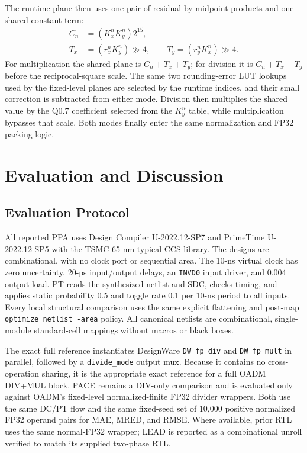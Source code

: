 \documentclass[conference]{IEEEtran}
\begin{document}
The runtime plane then uses one pair of residual-by-midpoint products and one
shared constant term:
\begin{align}
 C_n &= (K_x^nK_y^n)2^{15},\\
 T_x &= (r_x^nK_y^n) \gg 4,\qquad
 T_y = (r_y^nK_x^n) \gg 4.
\end{align}
For multiplication the shared plane is $C_n+T_x+T_y$; for division it is
$C_n+T_x-T_y$ before the reciprocal-square scale. The same two rounding-error
LUT lookups used by the fixed-level planes are selected by the runtime
indices, and their small correction is subtracted from either mode. Division
then multiplies the shared value by the Q0.7 coefficient selected from the
$K_y^n$ table, while multiplication bypasses that scale. Both modes finally
enter the same normalization and FP32 packing logic.

\section{Evaluation and Discussion}
\subsection{Evaluation Protocol}
All reported PPA uses Design Compiler U-2022.12-SP7 and PrimeTime
U-2022.12-SP5 with the TSMC 65-nm typical CCS library. The designs are
combinational, with no clock port or sequential area. The 10-ns virtual clock
has zero uncertainty, 20-ps input/output delays, an \texttt{INVD0} input
driver, and 0.004 output load. PT reads the synthesized netlist and SDC,
checks timing, and applies static probability 0.5 and toggle rate 0.1 per
10-ns period to all inputs. Every local structural comparison uses the same
explicit flattening and post-map \texttt{optimize\_netlist -area} policy.
All canonical netlists are combinational, single-module standard-cell mappings
without macros or black boxes.

The exact full reference instantiates DesignWare \texttt{DW\_fp\_div} and
\texttt{DW\_fp\_mult} in parallel, followed by a \texttt{divide\_mode} output
mux. Because it contains no cross-operation sharing, it is the appropriate
exact reference for a full OADM DIV+MUL block. PACE remains a DIV-only
comparison and is evaluated only against OADM's fixed-level normalized-finite
FP32 divider wrappers. Both use the same DC/PT flow and the same fixed-seed
set of 10,000 positive normalized FP32 operand pairs for MAE, MRED, and RMSE.
Where available, prior RTL uses the same normal-FP32 wrapper; LEAD is reported
as a combinational unroll verified to match its supplied two-phase RTL.
\end{document}
